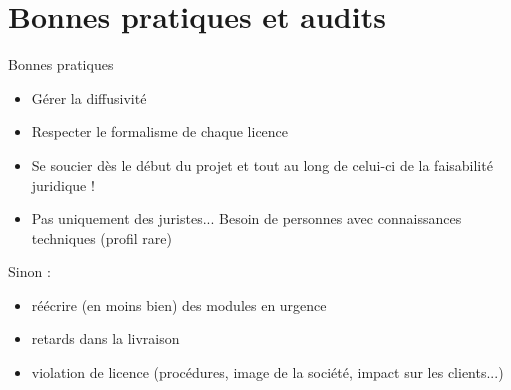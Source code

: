 \documentclass{beamer}
\begin{document}
\section{Bonnes pratiques et audits}

\begin{frame}{Bonnes pratiques}
  \begin{itemize}
  \item Gérer la diffusivité
  \item Respecter le formalisme de chaque licence
  \item Se soucier dès le début du projet et tout au long de celui-ci de la faisabilité juridique !
  \item Pas uniquement des juristes... Besoin de personnes avec connaissances techniques (profil rare)
  \end{itemize}

Sinon :

\begin{itemize}
\item réécrire (en moins bien) des modules en urgence
\item retards dans la livraison
\item violation de licence (procédures, image de la société, impact sur les clients...)
\end{itemize}
  
\end{frame}
\end{document}
